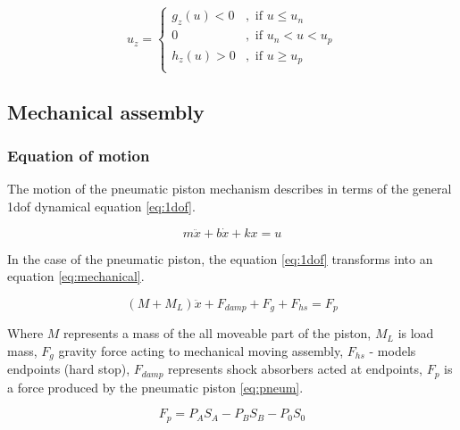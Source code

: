 \documentclass[class=article, crop=false]{standalone}
\begin{document}
\begin{equation}
    u_z = 
    \begin{cases}
        g_z(u) < 0 &, \text{ if } u \le u_n \\
        0          &, \text{ if } u_n < u < u_p \\
        h_z(u) > 0 &, \text{ if } u \ge u_p \\
    \end{cases}  
    \label{eq:deadzone}
\end{equation}



\subsection{Mechanical assembly}
\subsubsection{Equation of motion}

The motion of the pneumatic piston mechanism describes in terms of the
general 1dof dynamical equation \ref{eq:1dof}. 

\begin{equation}
    m\ddot{x} + b\dot{x} + kx = u
    \label{eq:1dof}
\end{equation}

In the case of the pneumatic piston, the equation \ref{eq:1dof}
transforms into an equation \ref{eq:mechanical}.

\begin{equation}
    (M + M_L) \ddot{x} + F_{damp} + F_g + F_{hs}  = F_p
    \label{eq:mechanical}
\end{equation}

Where $M$ represents a mass of the all moveable part of the piston,
$M_L$ is load mass, $F_g$ gravity force acting to mechanical moving assembly,
$F_{hs}$ - models endpoints (hard stop),
$F_{damp}$ represents shock absorbers acted at endpoints,
$F_{p}$ is a force produced by the pneumatic piston \ref{eq:pneum}.

\begin{equation}
    F_p = P_A S_A - P_B S_B - P_0 S_0
    \label{eq:pneum}
\end{equation}
\end{document}
